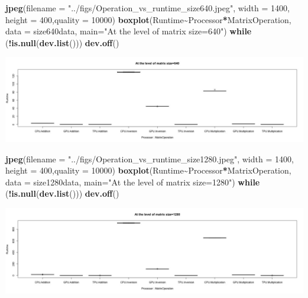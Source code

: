 \documentclass[
]{article}
\newenvironment{Shaded}{\begin{snugshade}}{\end{snugshade}}
\newcommand{\ControlFlowTok}[1]{\textcolor[rgb]{0.13,0.29,0.53}{\textbf{#1}}}
\newcommand{\DataTypeTok}[1]{\textcolor[rgb]{0.13,0.29,0.53}{#1}}
\newcommand{\DecValTok}[1]{\textcolor[rgb]{0.00,0.00,0.81}{#1}}
\newcommand{\KeywordTok}[1]{\textcolor[rgb]{0.13,0.29,0.53}{\textbf{#1}}}
\newcommand{\NormalTok}[1]{#1}
\newcommand{\OperatorTok}[1]{\textcolor[rgb]{0.81,0.36,0.00}{\textbf{#1}}}
\newcommand{\StringTok}[1]{\textcolor[rgb]{0.31,0.60,0.02}{#1}}
\begin{document}
\begin{Shaded}
\begin{Highlighting}[]
\KeywordTok{jpeg}\NormalTok{(}\DataTypeTok{filename =} \StringTok{"../figs/Operation\_vs\_runtime\_size640.jpeg"}\NormalTok{, }\DataTypeTok{width =} \DecValTok{1400}\NormalTok{, }\DataTypeTok{height =} \DecValTok{400}\NormalTok{,}\DataTypeTok{quality =} \DecValTok{10000}\NormalTok{)}
\KeywordTok{boxplot}\NormalTok{(Runtime}\OperatorTok{\textasciitilde{}}\NormalTok{Processor}\OperatorTok{*}\NormalTok{MatrixOperation, }\DataTypeTok{data =}\NormalTok{ size640data, }\DataTypeTok{main=}\StringTok{"At the level of matrix size=640"}\NormalTok{)}
\ControlFlowTok{while}\NormalTok{ (}\OperatorTok{!}\KeywordTok{is.null}\NormalTok{(}\KeywordTok{dev.list}\NormalTok{()))  }\KeywordTok{dev.off}\NormalTok{()}
\end{Highlighting}
\end{Shaded}

\begin{center}\includegraphics[width=0.9\linewidth]{../figs/Operation_vs_runtime_size640} \end{center}

\begin{Shaded}
\begin{Highlighting}[]
\KeywordTok{jpeg}\NormalTok{(}\DataTypeTok{filename =} \StringTok{"../figs/Operation\_vs\_runtime\_size1280.jpeg"}\NormalTok{, }\DataTypeTok{width =} \DecValTok{1400}\NormalTok{, }\DataTypeTok{height =} \DecValTok{400}\NormalTok{,}\DataTypeTok{quality =} \DecValTok{10000}\NormalTok{)}
\KeywordTok{boxplot}\NormalTok{(Runtime}\OperatorTok{\textasciitilde{}}\NormalTok{Processor}\OperatorTok{*}\NormalTok{MatrixOperation, }\DataTypeTok{data =}\NormalTok{ size1280data, }\DataTypeTok{main=}\StringTok{"At the level of matrix size=1280"}\NormalTok{)}
\ControlFlowTok{while}\NormalTok{ (}\OperatorTok{!}\KeywordTok{is.null}\NormalTok{(}\KeywordTok{dev.list}\NormalTok{()))  }\KeywordTok{dev.off}\NormalTok{()}
\end{Highlighting}
\end{Shaded}

\begin{center}\includegraphics[width=0.9\linewidth]{../figs/Operation_vs_runtime_size1280} \end{center}
\end{document}
